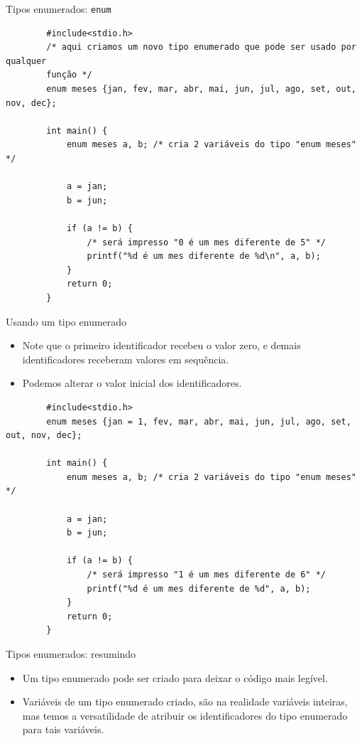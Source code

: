 \documentclass[handout]{beamer}
\begin{document}
\begin{frame}[fragile]{Tipos enumerados: \texttt{enum}}

    \begin{verbatim}
        #include<stdio.h>
        /* aqui criamos um novo tipo enumerado que pode ser usado por qualquer
        função */
        enum meses {jan, fev, mar, abr, mai, jun, jul, ago, set, out, nov, dec};

        int main() {
            enum meses a, b; /* cria 2 variáveis do tipo "enum meses" */

            a = jan;
            b = jun;

            if (a != b) {
                /* será impresso "0 é um mes diferente de 5" */
                printf("%d é um mes diferente de %d\n", a, b);
            }
            return 0;
        }
    \end{verbatim}

\end{frame}

\begin{frame}[fragile]{Usando um tipo enumerado}

    \begin{itemize}
        \item Note que o primeiro identificador recebeu o valor zero,
        e demais identificadores receberam valores em sequência.
        \item Podemos alterar o valor inicial dos identificadores.
    \end{itemize}

    \begin{verbatim}
        #include<stdio.h>
        enum meses {jan = 1, fev, mar, abr, mai, jun, jul, ago, set, out, nov, dec};

        int main() {
            enum meses a, b; /* cria 2 variáveis do tipo "enum meses" */

            a = jan;
            b = jun;

            if (a != b) {
                /* será impresso "1 é um mes diferente de 6" */
                printf("%d é um mes diferente de %d", a, b);
            }
            return 0;
        }
    \end{verbatim}

\end{frame}

\begin{frame}{Tipos enumerados: resumindo}

    \begin{itemize}
        \item Um tipo enumerado pode ser criado para deixar o código
        mais legível.
        \item Variáveis de um tipo enumerado criado, são na realidade
        variáveis inteiras, mas temos a versatilidade de atribuir os
        identificadores do tipo enumerado para tais variáveis.
    \end{itemize}

\end{frame}
\end{document}
